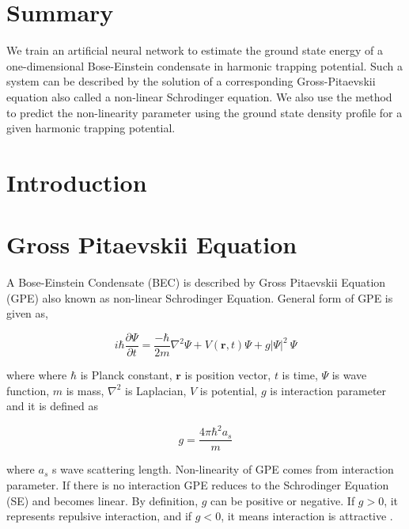 \documentclass[a4paper,times,12pt]{article}
\begin{document}
\setcounter{page}{1}

\section*{Summary}

We train an artificial neural network to estimate the ground state energy
of a one-dimensional Bose-Einstein condensate in harmonic trapping potential.
Such a system can be described by the solution of a corresponding
Gross-Pitaevskii equation also called a non-linear Schrodinger equation.
We also use the method to predict the non-linearity parameter using the ground
state density profile for a given harmonic trapping potential.


\section{Introduction}
\section{Gross Pitaevskii Equation}

A Bose-Einstein Condensate (BEC) is described by Gross Pitaevskii Equation (GPE) also known as non-linear Schrodinger Equation. General form of GPE is given as,

\begin{equation}
\label{eq:GPE_3D}
i \hbar \frac {\partial \Psi}{\partial t} = \frac {-\hbar}{2m}\nabla^2
\Psi + V(\boldsymbol{r}, t)\Psi + g|\Psi|^2\ \Psi
\end{equation}


where %
where $\hbar$ is Planck constant, $\boldsymbol{r}$ is position vector, $t$ is time, $\Psi$ is wave function, $m$ is mass, $\nabla^2$ is Laplacian, $V$ is potential, $g$ is interaction parameter and it is defined as 

\begin{equation}
\label{eq:GPE_inter_param}
g=\frac{4\pi\hbar^2a_s}{m}
\end{equation}

where $a_s$ s wave scattering length. Non-linearity of GPE comes from interaction parameter. If there is no interaction GPE reduces to the Schrodinger Equation (SE) and becomes linear. By definition, $g$ can be positive or negative. If $g > 0$, it represents repulsive interaction, and if $g < 0$, it means interaction is attractive \cite{barenghi2016primer}.
\end{document}
